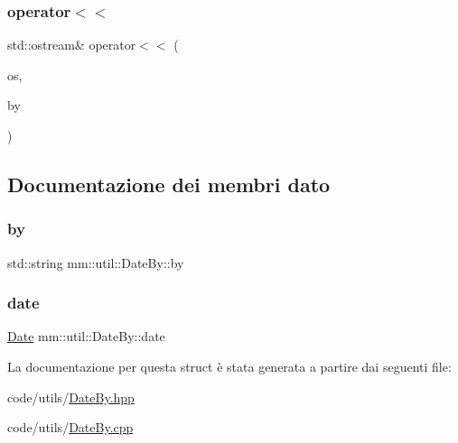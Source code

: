 \subsubsection{\texorpdfstring{operator$<$$<$}{operator<<}}
{\footnotesize\ttfamily std\+::ostream\& operator$<$$<$ (\begin{DoxyParamCaption}\item[{std\+::ostream \&}]{os,  }\item[{const \hyperlink{structmm_1_1util_1_1_date_by}{Date\+By} \&}]{by }\end{DoxyParamCaption})\hspace{0.3cm}{\ttfamily [friend]}}



\subsection{Documentazione dei membri dato}
\mbox{\label{structmm_1_1util_1_1_date_by_ae431f5029222a6ec9293c4c4564834f3}} 
\subsubsection{\texorpdfstring{by}{by}}
{\footnotesize\ttfamily std\+::string mm\+::util\+::\+Date\+By\+::by}

\mbox{\label{structmm_1_1util_1_1_date_by_a4adb77c6560794be119e39b374498b68}} 
\subsubsection{\texorpdfstring{date}{date}}
{\footnotesize\ttfamily \hyperlink{structmm_1_1util_1_1_date}{Date} mm\+::util\+::\+Date\+By\+::date}



La documentazione per questa struct è stata generata a partire dai seguenti file\+:\begin{DoxyCompactItemize}
\item 
code/utils/\hyperlink{_date_by_8hpp}{Date\+By.\+hpp}\item 
code/utils/\hyperlink{_date_by_8cpp}{Date\+By.\+cpp}\end{DoxyCompactItemize}
